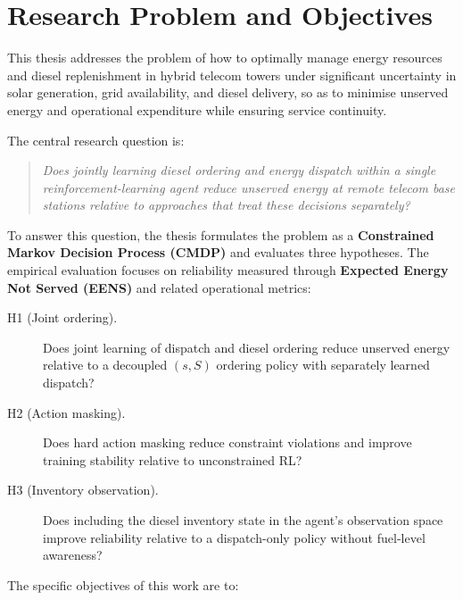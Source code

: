 \section{Research Problem and Objectives}

This thesis addresses the problem of how to optimally manage energy resources
and diesel replenishment in hybrid telecom towers under significant uncertainty
in solar generation, grid availability, and diesel delivery, so as to minimise
unserved energy and operational expenditure while ensuring service continuity.

The central research question is:

\begin{quote}
\emph{Does jointly learning diesel ordering and energy dispatch within a single
reinforcement-learning agent reduce unserved energy at remote telecom
base stations relative to approaches that treat these decisions separately?}
\end{quote}

To answer this question, the thesis formulates the problem as a
\textbf{Constrained Markov Decision Process (CMDP)} and evaluates three
hypotheses. The empirical evaluation focuses on reliability
measured through \textbf{Expected Energy Not Served (EENS)} and related
operational metrics:

\begin{description}
  \item[H1 (Joint ordering).] Does joint learning of dispatch and diesel
  ordering reduce unserved energy relative to a decoupled $(s,S)$ ordering
  policy with separately learned dispatch?
  \item[H2 (Action masking).] Does hard action masking reduce constraint
  violations and improve training stability relative to unconstrained RL?
  \item[H3 (Inventory observation).] Does including the diesel inventory state
  in the agent's observation space improve reliability relative to a
  dispatch-only policy without fuel-level awareness?
\end{description}

The specific objectives of this work are to:

